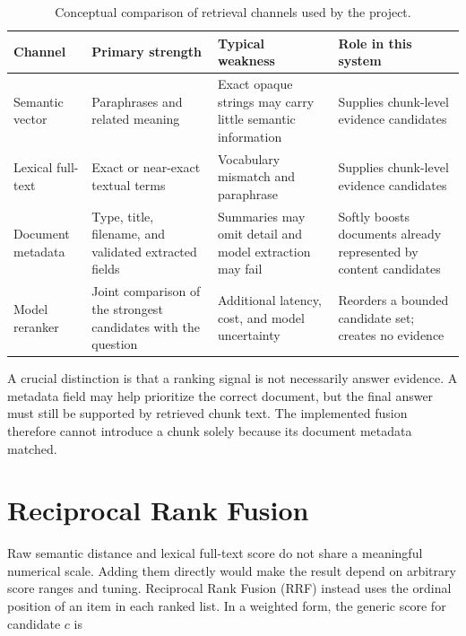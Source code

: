 \begin{table}[!htbp]
    \centering
    \caption{Conceptual comparison of retrieval channels used by the project.}
    \label{tab:retrieval-channel-comparison}
    \small
    \begin{tabular}{@{}L{0.18\textwidth} L{0.28\textwidth} L{0.25\textwidth} L{0.20\textwidth}@{}}
        \toprule
        \textbf{Channel} & \textbf{Primary strength} & \textbf{Typical weakness} & \textbf{Role in this system} \\
        \midrule
        Semantic vector & Paraphrases and related meaning & Exact opaque strings may carry little semantic information & Supplies chunk-level evidence candidates \\
        Lexical full-text & Exact or near-exact textual terms & Vocabulary mismatch and paraphrase & Supplies chunk-level evidence candidates \\
        Document metadata & Type, title, filename, and validated extracted fields & Summaries may omit detail and model extraction may fail & Softly boosts documents already represented by content candidates \\
        Model reranker & Joint comparison of the strongest candidates with the question & Additional latency, cost, and model uncertainty & Reorders a bounded candidate set; creates no evidence \\
        \bottomrule
    \end{tabular}
\end{table}

A crucial distinction is that a ranking signal is not necessarily answer evidence. A metadata field may help prioritize the correct document, but the final answer must still be supported by retrieved chunk text. The implemented fusion therefore cannot introduce a chunk solely because its document metadata matched.

\section{Reciprocal Rank Fusion}
\label{sec:background-rrf}

Raw semantic distance and lexical full-text score do not share a meaningful numerical scale. Adding them directly would make the result depend on arbitrary score ranges and tuning. Reciprocal Rank Fusion (RRF) instead uses the ordinal position of an item in each ranked list. In a weighted form, the generic score for candidate $c$ is

